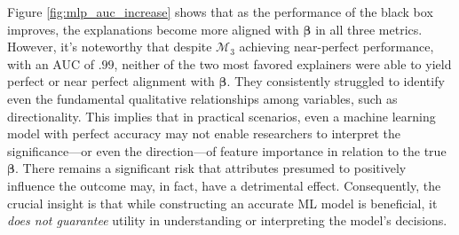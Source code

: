 \documentclass[mnsc,blindrev]{informs3}
\begin{document}
     Figure \ref{fig:mlp_auc_increase} shows that as the performance of the black box improves, the explanations become more aligned with $\boldsymbol{\beta}$ in all three metrics. However, it's noteworthy that despite $\mathcal{M}_3$ achieving near-perfect performance, with an AUC of $.99$, neither of the two most favored explainers were able to yield perfect or near perfect alignment with $\boldsymbol{\beta}$. They consistently struggled to identify even the fundamental qualitative relationships among variables, such as directionality. This implies that in practical scenarios, even a machine learning model with perfect accuracy may not enable researchers to interpret the significance—or even the direction—of feature importance in relation to the true $\boldsymbol{\beta}$. There remains a significant risk that attributes presumed to positively influence the outcome may, in fact, have a detrimental effect. Consequently, the crucial insight is that while constructing an accurate ML model is beneficial, it \emph{does not guarantee} utility in understanding or interpreting the model's decisions. 
            
\end{document}
